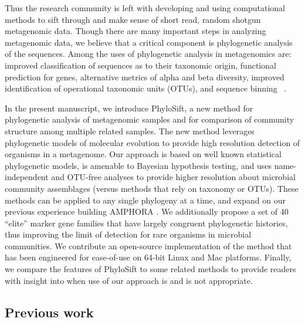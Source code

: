 \documentclass[10pt]{article}
\begin{document}
Thus the research community is left with developing and using computational methods to sift through and make sense of short read, random shotgun metagenomic data.
Though there are many important steps in analyzing metagenomic data, we believe that a critical component is phylogenetic analysis of the sequences.
Among the uses of phylogenetic analysis in metagenomics are: improved classification of sequences as to their taxonomic origin, functional prediction for genes, alternative metrics of alpha and beta diversity, improved identification of operational taxonomic units (OTUs), and sequence binning ~\cite{meyer2008metagenomics, Matsen2010, Evans2010, Kembel2011, Matsen2012, Stark2010, Wu2012, Brady2009, Brady2011, Sharpton2011, Jolley2012, sunagawa2013metagenomic}.

In the present manuscript, we introduce PhyloSift, a new method for phylogenetic analysis of metagenomic samples and for comparison of community structure among multiple related samples.
The new method leverages phylogenetic models of molecular evolution to provide high resolution detection of organisms in a metagenome.
Our approach is based on well known statistical phylogenetic models, is amenable to Bayesian hypothesis testing, and uses name-independent and OTU-free analyses to provide higher resolution about microbial community assemblages (versus methods that rely on taxonomy or OTUs).
These methods can be applied to any single phylogeny at a time, and expand on our previous experience building AMPHORA \cite{WuEisen2008}.
We additionally propose a set of 40 ``elite'' marker gene families that have largely congruent phylogenetic histories, thus improving the limit of detection for rare organisms in microbial communities.
We contribute an open-source implementation of the method that has been engineered for ease-of-use on 64-bit Linux and Mac platforms.
Finally, we compare the features of PhyloSift to some related methods to provide readers with insight into when use of our approach is and is not appropriate.

\subsection*{Previous work}
\end{document}

